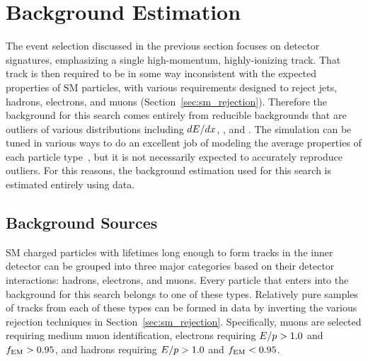 \chapter{Background Estimation}

\label{ch:background}

The event selection discussed in the previous section focuses on detector signatures, emphasizing a single high-momentum, highly-ionizing track.
That track is then required to be in some way inconsistent with the expected properties of \ac{SM} particles, with various requirements designed to reject jets, hadrons, electrons, and muons (Section~\ref{sec:sm_rejection}).
Therefore the background for this search comes entirely from reducible backgrounds that are outliers of various distributions including $dE/dx$, \emfrac, and \ptcone.
The simulation can be tuned in various ways to do an excellent job of modeling the average properties of each particle type~\cite{atlas_sim}, but it is not necessarily expected to accurately reproduce outliers.
For this reasons, the background estimation used for this search is estimated entirely using data.

\section{Background Sources}

\ac{SM} charged particles with lifetimes long enough to form tracks in the inner detector can be grouped into three major categories based on their detector interactions: hadrons, electrons, and muons. 
Every particle that enters into the background for this search belongs to one of these types.
Relatively pure samples of tracks from each of these types can be formed in data by inverting the various rejection techniques in Section~\ref{sec:sm_rejection}.
Specifically, muons are selected requiring medium muon identification, electrons requiring $E/p > 1.0$ and $f_\mathrm{EM} > 0.95$, and hadrons requiring $E/p > 1.0$ and $f_\mathrm{EM} < 0.95$. 

